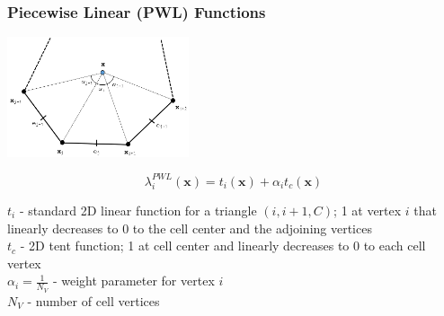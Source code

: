 \documentclass[compress,10pt]{beamer}
\renewcommand{\vec}[1]{\mathbf{#1}}
\begin{document}
\begin{frame}[t]\frametitle{Piecewise Linear (PWL) Functions}
\centering
\includegraphics[width=0.40\textwidth]{images/ref_polygon.png}
\vspace{0.3cm}
\begin{block}{}
\begin{equation*}
\lambda_i^{PWL} (\vec{x}) =  t_i (\vec{x}) + \alpha_i t_c (\vec{x})
\end{equation*}
\end{block}
\begin{block}{}
$t_i $ - standard 2D linear function for a triangle $(i,i+1,C)$; 1 at vertex $i$ that linearly decreases to 0 to the cell center and the adjoining vertices \\ \vspace{1mm}
$t_c$ - 2D tent function; 1 at cell center and linearly decreases to 0 to each cell vertex \\ \vspace{1mm}
$\alpha_i = \frac{1}{N_V}$ - weight parameter for vertex $i$ \\ \vspace{1mm}
$N_V$ - number of cell vertices
\end{block}
\end{frame}
\end{document}
